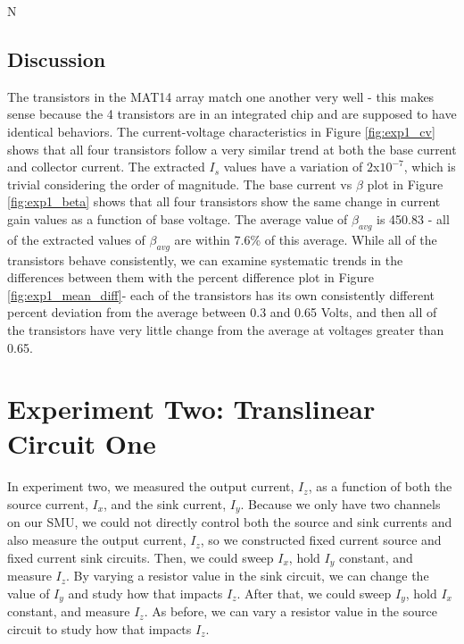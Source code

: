 N\documentclass{article}
\begin{document}
\subsection{Discussion}
The transistors in the MAT14 array match one another very well - this  makes sense because the 4 transistors are in an integrated chip and are supposed to have identical behaviors.  The current-voltage characteristics in Figure \ref{fig:exp1_cv} shows that all four transistors follow a very similar trend at both the base current and collector current. The extracted $I_{s}$ values have a variation of \textpm  $2 $x$ 10^{-7}$, which is trivial considering the order of magnitude.  The base current vs $\beta$ plot in Figure \ref{fig:exp1_beta} shows that all four transistors show the same change in current gain values as a function of base voltage.  The average value of $\beta_{avg}$ is 450.83 - all of the extracted values of $\beta_{avg}$ are within 7.6\% of this average. While all of the transistors behave consistently, we can examine systematic trends in the differences between them with the percent difference plot in Figure \ref{fig:exp1_mean_diff}- each of the transistors has its own consistently different percent deviation from the average between 0.3 and 0.65 Volts, and then all of the transistors have very little change from the average at voltages greater than 0.65.  
\newline
\newline
\section{Experiment Two: Translinear Circuit One}
In experiment two, we measured the output current, $I_z$, as a function of both the source current, $I_x$, and the sink current, $I_y$. Because we only have two channels on our SMU, we could not directly control both the source and sink currents and also measure the output current, $I_z$, so we constructed fixed current source and fixed current sink circuits. Then, we could sweep $I_x$, hold $I_y$ constant, and measure $I_z$. By varying a resistor value in the sink circuit, we can change the value of $I_y$ and study how that impacts $I_z$. After that, we could sweep $I_y$, hold $I_x$ constant, and measure $I_z$. As before, we can vary a resistor value in the source circuit to study how that impacts $I_z$.
\end{document}
